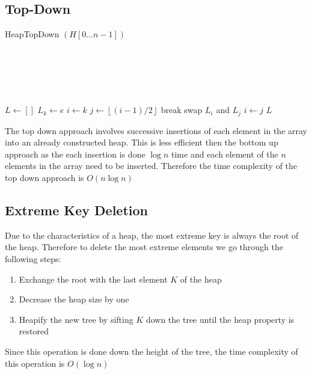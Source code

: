 \documentclass[12pt letter]{report}
\begin{document}
\subsection{Top-Down}
\begin{algorithm}[H]
  \caption{HeapTopDown $ \left( H \left[ 0 \ldots n-1 \right]\right) $}
  \Comment{}\\
   \\
   \\
   \\
  \begin{algorithmic}[1]
    \State $L \gets \left[ \right]$ 
    \State $L_{k} \gets e$ 
    \State $i \gets k$
    \State $ j \gets \left\lfloor (i - 1) / 2 \right\rfloor$
    \State break
    \Else
    \State swap $L_i$ and $L_j$
    \State $i \gets j$
    \EndIf
    \EndWhile
    \EndFor
    \State \Return $L$

  \end{algorithmic}
\end{algorithm}
The top down approach involves successive insertions of each element in the array into an already constructed heap. This
is less efficient then the bottom up approach as the each insertion is done $ \log n$ time and each element of the $n$
elements in the array need to be inserted. Therefore the time complexity of the top down approach is $O(n \log n)$

\subsection{Extreme Key Deletion}
Due to the characteristics of a heap, the most extreme key is always the root of the heap. Therefore to delete the most
extreme elements we go through the following steps:
\begin{enumerate}
  \item Exchange the root with the last element $K$ of the heap
  \item Decrease the heap size by one
  \item Heapify the  new tree by sifting $K$ down the tree until the heap property is restored
\end{enumerate}
Since this operation is done down the height of the tree, the time complexity of this operation is $O(\log n)$
\end{document}
